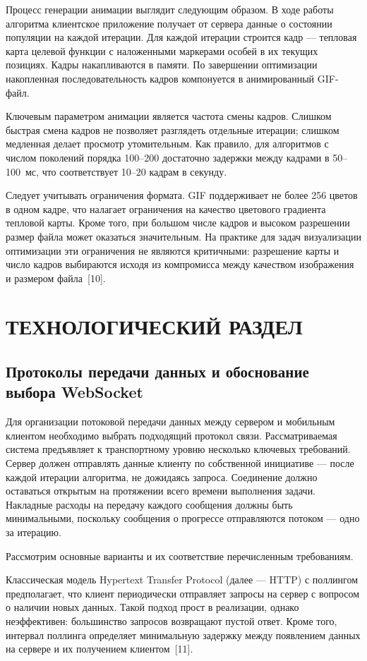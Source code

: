 \documentclass[14pt, russian]{scrartcl}
\begin{document}
Процесс генерации анимации выглядит следующим образом. В ходе работы
алгоритма клиентское приложение получает от сервера данные о состоянии
популяции на каждой итерации. Для каждой итерации строится кадр ---
тепловая карта целевой функции с наложенными маркерами особей в их
текущих позициях. Кадры накапливаются в памяти. По завершении
оптимизации накопленная последовательность кадров компонуется в
анимированный GIF-файл.

Ключевым параметром анимации является частота смены кадров. Слишком
быстрая смена кадров не позволяет разглядеть отдельные итерации; слишком
медленная делает просмотр утомительным. Как правило, для алгоритмов
с числом поколений порядка 100--200 достаточно задержки между кадрами
в 50--100~мс, что соответствует 10--20 кадрам в секунду.

Следует учитывать ограничения формата. GIF поддерживает не более 256
цветов в одном кадре, что налагает ограничения на качество цветового
градиента тепловой карты. Кроме того, при большом числе кадров и высоком
разрешении размер файла может оказаться значительным. На практике
для задач визуализации оптимизации эти ограничения не являются
критичными: разрешение карты и число кадров выбираются исходя из
компромисса между качеством изображения и размером файла~[10].


\section{ТЕХНОЛОГИЧЕСКИЙ РАЗДЕЛ}

\subsection{Протоколы передачи данных и обоснование выбора WebSocket}

Для организации потоковой передачи данных между сервером и мобильным
клиентом необходимо выбрать подходящий протокол связи. Рассматриваемая
система предъявляет к транспортному уровню несколько ключевых требований.
Сервер должен отправлять данные клиенту по собственной инициативе ---
после каждой итерации алгоритма, не дожидаясь запроса. Соединение должно
оставаться открытым на протяжении всего времени выполнения задачи. Накладные
расходы на передачу каждого сообщения должны быть минимальными, поскольку
сообщения о прогрессе отправляются потоком --- одно за итерацию.

Рассмотрим основные варианты и их соответствие перечисленным требованиям.

Классическая модель Hypertext Transfer Protocol (далее --- HTTP) с поллингом предполагает, 
что клиент периодически отправляет запросы на сервер с вопросом о наличии новых данных. Такой
подход прост в реализации, однако неэффективен: большинство запросов
возвращают пустой ответ. Кроме того, интервал поллинга определяет
минимальную задержку между появлением данных на сервере и их получением
клиентом~[11].
\end{document}
